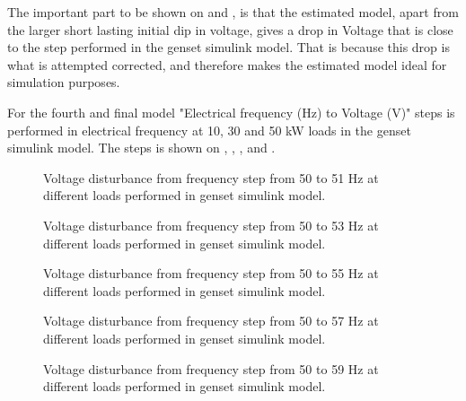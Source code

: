 The important part to be shown on  and , is that the estimated model, apart from the larger short lasting initial dip in voltage, gives a drop in Voltage that is close to the step performed in the genset simulink model. That is because this drop is what is attempted corrected, and therefore makes the estimated model ideal for simulation purposes.

For the fourth and final model "Electrical frequency (Hz) to Voltage (V)" steps is performed in electrical frequency at 10, 30 and 50 kW loads in the genset simulink model. The steps is shown on , , ,  and .

\begin{figure}[H]
\centering

\caption{Voltage disturbance from frequency step from 50 to 51 Hz at different loads performed in genset simulink model.}
\label{fig:freq5051_103050kw_volt}
\end{figure}

\begin{figure}[H]
\centering

\caption{Voltage disturbance from frequency step from 50 to 53 Hz at different loads performed in genset simulink model.}
\label{fig:freq5053_103050kw_volt}
\end{figure}

\begin{figure}[H]
\centering

\caption{Voltage disturbance from frequency step from 50 to 55 Hz at different loads performed in genset simulink model.}
\label{fig:freq5055_103050kw_volt}
\end{figure}

\begin{figure}[H]
\centering

\caption{Voltage disturbance from frequency step from 50 to 57 Hz at different loads performed in genset simulink model.}
\label{fig:freq5057_103050kw_volt}
\end{figure}

\begin{figure}[H]
\centering

\caption{Voltage disturbance from frequency step from 50 to 59 Hz at different loads performed in genset simulink model.}
\label{fig:freq5059_103050kw_volt}
\end{figure}


